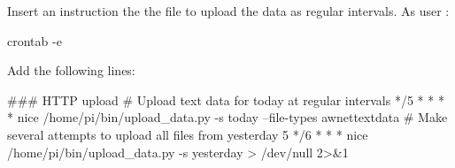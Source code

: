 Insert an instruction the the  file to upload the
data as regular intervals. As user \piUser:
\begin{Cmd}
crontab -e
\end{Cmd}
Add the following lines:
\begin{Code}[fontsize=\small]
### HTTP upload
# Upload text data for today at regular intervals
*/5 * * * * nice /home/pi/bin/upload_data.py -s today --file-types awnettextdata
# Make several attempts to upload all files from yesterday
5 */6 * * * nice /home/pi/bin/upload_data.py -s yesterday > /dev/null 2>&1
\end{Code}
